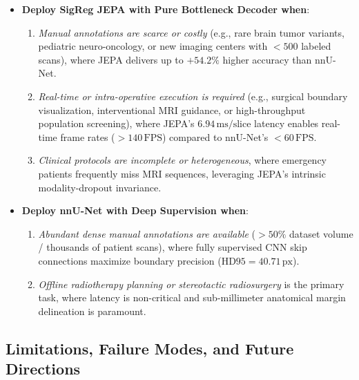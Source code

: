 \documentclass{article}
\begin{document}
\begin{itemize}
    \item \textbf{Deploy SigReg JEPA with Pure Bottleneck Decoder when}:
    \begin{enumerate}
        \item \emph{Manual annotations are scarce or costly} (e.g., rare brain tumor variants, pediatric neuro-oncology, or new imaging centers with $< 500$ labeled scans), where JEPA delivers up to $+54.2\%$ higher accuracy than nnU-Net.
        \item \emph{Real-time or intra-operative execution is required} (e.g., surgical boundary visualization, interventional MRI guidance, or high-throughput population screening), where JEPA's $6.94\,\text{ms/slice}$ latency enables real-time frame rates ($>140\,\text{FPS}$) compared to nnU-Net's $<60\,\text{FPS}$.
        \item \emph{Clinical protocols are incomplete or heterogeneous}, where emergency patients frequently miss MRI sequences, leveraging JEPA's intrinsic modality-dropout invariance.
    \end{enumerate}
    
    \item \textbf{Deploy nnU-Net with Deep Supervision when}:
    \begin{enumerate}
        \item \emph{Abundant dense manual annotations are available} ($> 50\%$ dataset volume / thousands of patient scans), where fully supervised CNN skip connections maximize boundary precision ($\text{HD95} = 40.71\,\text{px}$).
        \item \emph{Offline radiotherapy planning or stereotactic radiosurgery} is the primary task, where latency is non-critical and sub-millimeter anatomical margin delineation is paramount.
    \end{enumerate}
\end{itemize}

\subsection{Limitations, Failure Modes, and Future Directions}
\end{document}
